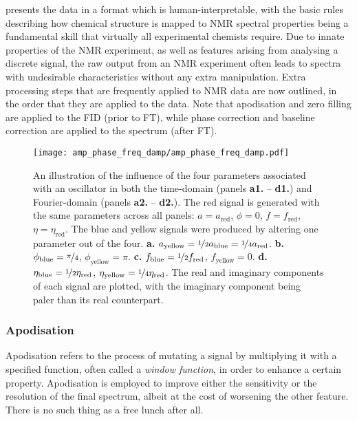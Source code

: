 presents the data in a format which is human-interpretable, with the basic
rules describing how chemical structure is mapped to \ac{NMR} spectral
properties being a fundamental skill that virtually all experimental chemists
require\cite{Hore2015b}. Due to innate properties of the \ac{NMR} experiment,
as well as features arising from analysing a discrete signal, the raw output
from an \ac{NMR} experiment often leads to spectra with undesirable
characteristics without any extra manipulation. Extra processing
steps that are frequently applied to \ac{NMR} data are now outlined, in the
order that they are applied to the data. Note that apodisation and zero filling
are applied to the \ac{FID} (prior to \ac{FT}), while phase correction and
baseline correction are applied to the spectrum (after \ac{FT}).

\begin{figure}
    \centering
    \texttt{[image: amp\_phase\_freq\_damp/amp\_phase\_freq\_damp.pdf]}
    \caption[
        An illustration of the influence of the four parameters associated
        with an oscillator in both the time-domain nels and Fourier-domain.
    ]{
        An illustration of the influence of the four parameters associated
        with an oscillator in both the time-domain (panels \textbf{a1.} --
        \textbf{d1.}) and Fourier-domain (panels \textbf{a2.} -- \textbf{d2.}).
        The red signal is generated with the same parameters across all panels:
        $a = a_{\text{red}}$, $\phi = 0$, $f = f_{\text{red}}$,  $\eta =
        \eta_{\text{red}}$.  The blue and yellow signals were produced by
        altering one parameter out of the four.
        \textbf{a.} $a_{\text{yellow}} = \nicefrac{1}{2} a_{\text{blue}} =
        \nicefrac{1}{4} a_{\text{red}}$.
        \textbf{b.}
        $\phi_{\text{blue}} = \nicefrac{\pi}{4}$,
        $\phi_{\text{yellow}} = \pi$.
        \textbf{c.}
        $f_{\text{blue}} = \nicefrac{1}{2} f_{\text{red}}$,
        $f_{\text{yellow}} = 0$.
        \textbf{d.}
        $\eta_{\text{blue}} = \nicefrac{1}{2}\eta_{\text{red}}$,
        $\eta_{\text{yellow}} = \nicefrac{1}{4}\eta_{\text{red}}$.
        The real and imaginary components of each signal are plotted, with the
        imaginary component being paler than its real counterpart.
    }
    \label{fig:amp-phase-freq-damp}
\end{figure}

\subsubsection{Apodisation}
Apodisation refers to the process of mutating a signal by multiplying it with a
specified function, often called a \emph{window function}, in order to enhance
a certain property. Apodisation is employed to improve either the sensitivity
or the resolution of the final spectrum, albeit at the cost of worsening the
other feature. There is no such thing as a free lunch after all.

